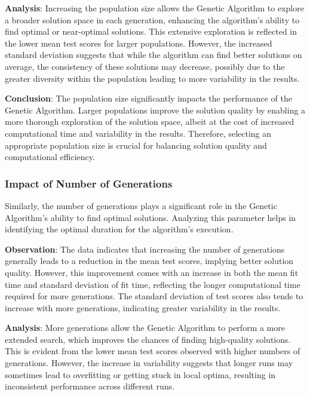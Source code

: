 \documentclass{article}
\begin{document}
    \textbf{Analysis}: Increasing the population size allows the Genetic Algorithm to explore a broader solution space in each generation, enhancing the algorithm's ability to find optimal or near-optimal solutions. This extensive exploration is reflected in the lower mean test scores for larger populations. However, the increased standard deviation suggests that while the algorithm can find better solutions on average, the consistency of these solutions may decrease, possibly due to the greater diversity within the population leading to more variability in the results.

    \textbf{Conclusion}: The population size significantly impacts the performance of the Genetic Algorithm. Larger populations improve the solution quality by enabling a more thorough exploration of the solution space, albeit at the cost of increased computational time and variability in the results. Therefore, selecting an appropriate population size is crucial for balancing solution quality and computational efficiency.

    \subsubsection{Impact of Number of Generations}

    Similarly, the number of generations plays a significant role in the Genetic Algorithm’s ability to find optimal solutions. Analyzing this parameter helps in identifying the optimal duration for the algorithm’s execution.

    \textbf{Observation}: The data indicates that increasing the number of generations generally leads to a reduction in the mean test scores, implying better solution quality. However, this improvement comes with an increase in both the mean fit time and standard deviation of fit time, reflecting the longer computational time required for more generations. The standard deviation of test scores also tends to increase with more generations, indicating greater variability in the results.

    \textbf{Analysis}: More generations allow the Genetic Algorithm to perform a more extended search, which improves the chances of finding high-quality solutions. This is evident from the lower mean test scores observed with higher numbers of generations. However, the increase in variability suggests that longer runs may sometimes lead to overfitting or getting stuck in local optima, resulting in inconsistent performance across different runs.
\end{document}

